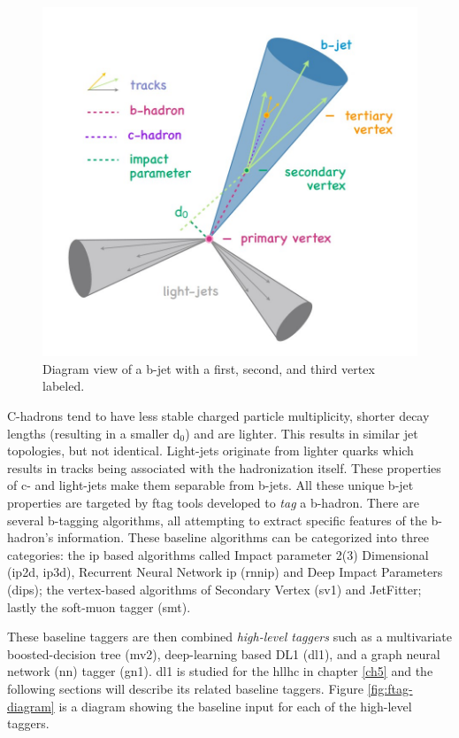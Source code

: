 \begin{figure}[h]
    \centering
    \includegraphics[scale=0.5]{figs/ch4/bjet-cartoon.jpg}
    \caption{ Diagram view of a b-jet with a first, second, and third vertex labeled.}
\label{fig:bjet-cartoon}
\end{figure}

C-hadrons tend to have less stable charged particle multiplicity, shorter decay lengths (resulting in a smaller $\textrm{d}_{\textrm{0}}$) and are lighter. This results in 
similar jet topologies, but not identical. Light-jets originate from lighter quarks which results in tracks being associated with the hadronization itself. These properties 
of c- and light-jets make them separable from b-jets. All these unique b-jet properties are targeted by \gls{ftag} tools developed to \textit{tag} a b-hadron. There are several 
b-tagging algorithms, all attempting to extract specific features of the b-hadron's information. These baseline algorithms can be categorized into three categories:
the \gls{ip} based algorithms called Impact parameter 2(3) Dimensional (\gls{ip2d}, \gls{ip3d}), Recurrent Neural Network \gls{ip} (\gls{rnnip}) and Deep Impact Parameters (\gls{dips});
the vertex-based algorithms of Secondary Vertex (\gls{sv1}) and JetFitter; lastly the soft-muon tagger (\gls{smt}).
\par
These baseline taggers are then combined \textit{high-level taggers} such as a multivariate boosted-decision tree (\gls{mv2}), deep-learning based DL1 (\gls{dl1}), and a graph 
neural network (\gls{nn}) tagger (\gls{gn1}). \gls{dl1} is studied for the \gls{hllhc} in chapter \ref{ch5} and the following sections will describe its related baseline taggers.
Figure \ref{fig:ftag-diagram} is a diagram showing the baseline input for each of the high-level taggers. 

